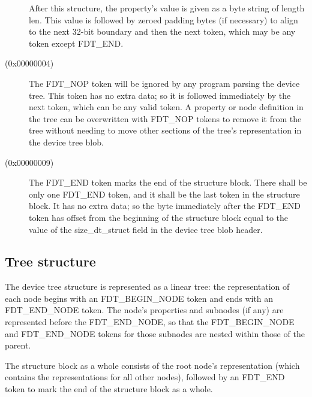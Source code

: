 \documentclass[a4paper,10pt,oneside]{sphinxmanual}
\begin{document}
\begin{description}
After this structure, the property’s value is given as a byte string of
length len. This value is followed by zeroed padding bytes (if
necessary) to align to the next 32-bit boundary and then the next token,
which may be any token except FDT\_END.

\item[{\code{FDT\_NOP} (0x00000004)}] \leavevmode
The FDT\_NOP token will be ignored by any program parsing the device
tree. This token has no extra data; so it is followed immediately by
the next token, which can be any valid token. A property or node
definition in the tree can be overwritten with FDT\_NOP tokens to
remove it from the tree without needing to move other sections of
the tree’s representation in the device tree blob.

\item[{\code{FDT\_END} (0x00000009)}] \leavevmode
The FDT\_END token marks the end of the structure block. There shall
be only one FDT\_END token, and it shall be the last token in the
structure block. It has no extra data; so the byte immediately after
the FDT\_END token has offset from the beginning of the structure
block equal to the value of the size\_dt\_struct field in the device
tree blob header.

\end{description}


\subsection{Tree structure}
\label{flattened-format:tree-structure}
The device tree structure is represented as a linear tree: the
representation of each node begins with an FDT\_BEGIN\_NODE token and
ends with an FDT\_END\_NODE token. The node’s properties and subnodes
(if any) are represented before the FDT\_END\_NODE, so that the
FDT\_BEGIN\_NODE and FDT\_END\_NODE tokens for those subnodes are nested
within those of the parent.

The structure block as a whole consists of the root node’s
representation (which contains the representations for all other nodes),
followed by an FDT\_END token to mark the end of the structure block as
a whole.
\end{document}
